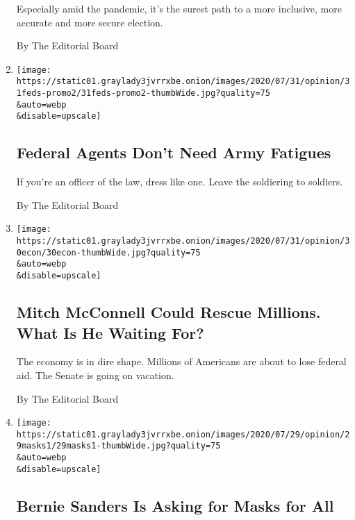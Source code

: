 \begin{enumerate}
  Especially amid the pandemic, it's the surest path to a more
  inclusive, more accurate and more secure election.

  By The Editorial Board
\item
  \href{/2020/07/31/opinion/federal-agents-trump-uniforms.html}{}

  \texttt{[image: https://static01.graylady3jvrrxbe.onion/images/2020/07/31/opinion/31feds-promo2/31feds-promo2-thumbWide.jpg?quality=75\\\&auto=webp\\\&disable=upscale]}

  \hypertarget{federal-agents-dont-need-army-fatigues}{%
  \subsection{Federal Agents Don't Need Army
  Fatigues}\label{federal-agents-dont-need-army-fatigues}}

  If you're an officer of the law, dress like one. Leave the soldiering
  to soldiers.

  By The Editorial Board
\item
  \href{/2020/07/30/opinion/mitch-mcconnell-coronavirus-economy.html}{}

  \texttt{[image: https://static01.graylady3jvrrxbe.onion/images/2020/07/31/opinion/30econ/30econ-thumbWide.jpg?quality=75\\\&auto=webp\\\&disable=upscale]}

  \hypertarget{mitch-mcconnell-could-rescue-millions-what-is-he-waiting-for}{%
  \subsection{Mitch McConnell Could Rescue Millions. What Is He Waiting
  For?}\label{mitch-mcconnell-could-rescue-millions-what-is-he-waiting-for}}

  The economy is in dire shape. Millions of Americans are about to lose
  federal aid. The Senate is going on vacation.

  By The Editorial Board
\item
  \href{/2020/07/29/opinion/us-coronavirus-masks.html}{}

  \texttt{[image: https://static01.graylady3jvrrxbe.onion/images/2020/07/29/opinion/29masks1/29masks1-thumbWide.jpg?quality=75\\\&auto=webp\\\&disable=upscale]}

  \hypertarget{bernie-sanders-is-asking-for-masks-for-all}{%
  \subsection{Bernie Sanders Is Asking for Masks for
  All}\label{bernie-sanders-is-asking-for-masks-for-all}}


\end{enumerate}
